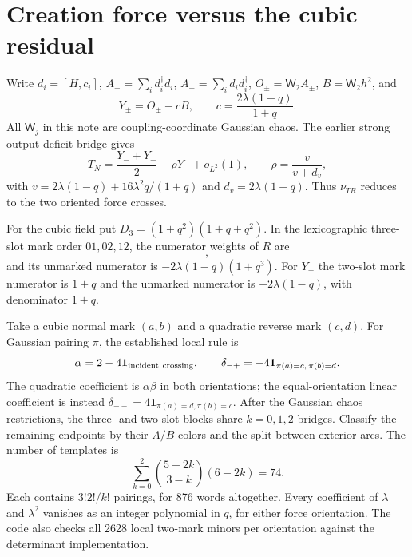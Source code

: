 \documentclass[11pt,a4paper]{article}
\newcommand{\W}[1]{\mathsf W_{#1}}
\begin{document}
\newpage
\section{Creation force versus the cubic residual}
Write $d_i=[H,c_i]$, $A_- =\sum_i d_i^\dagger d_i$,
$A_+=\sum_i d_id_i^\dagger$,
$O_\pm=\W2 A_\pm$, $B=\W2h^2$, and
\begin{equation}
 Y_\pm=O_\pm-cB,\qquad c=\frac{2\lambda(1-q)}{1+q}.
\end{equation}
All $\W j$ in this note are coupling-coordinate Gaussian chaos.
The earlier strong output-deficit bridge gives
\begin{equation}
 T_N=\frac{Y_-+Y_+}{2}-\rho Y_-+o_{L^2}(1),\qquad
 \rho=\frac{v}{v+d_v},
\end{equation}
with $v=2\lambda(1-q)+16\lambda^2q/(1+q)$ and $d_v=2\lambda(1+q)$.
Thus $\nu_{TR}$ reduces to the two oriented force crosses.

For the cubic field put $D_3=(1+q^2)(1+q+q^2)$. In the
lexicographic three-slot mark order $01,02,12$, the numerator
weights of $R$ are
\begin{equation}
 [-q(1+q+q^2),\ D_3,\ -q(1+q+q^2)],
\end{equation}
and its unmarked numerator is $-2\lambda(1-q)(1+q^3)$.
For $Y_+$ the two-slot mark numerator is $1+q$ and the unmarked
numerator is $-2\lambda(1-q)$, with denominator $1+q$.

Take a cubic normal mark $(a,b)$ and a quadratic reverse mark
$(c,d)$. For Gaussian pairing $\pi$, the established local rule is
\begin{equation}
 \alpha=2-4\mathbf1_{\rm incident\ crossing},\qquad
 \delta_{-+}=-4\mathbf1_{\pi(a)=c,\,\pi(b)=d}.
\end{equation}
The quadratic coefficient is $\alpha\beta$ in both orientations;
the equal-orientation linear coefficient is instead
$\delta_{--}=4\mathbf1_{\pi(a)=d,\pi(b)=c}$.
After the Gaussian chaos restrictions, the three- and two-slot
blocks share $k=0,1,2$ bridges. Classify the remaining endpoints
by their $A/B$ colors and the split between exterior arcs. The
number of templates is
\begin{equation}
 \sum_{k=0}^2\binom{5-2k}{3-k}(6-2k)=74.
\end{equation}
Each contains $3!2!/k!$ pairings, for 876 words altogether.
Every coefficient of $\lambda$ and $\lambda^2$ vanishes as an
integer polynomial in $q$, for either force orientation.
The code also checks all 2628 local two-mark minors per orientation
against the determinant implementation.
\end{document}
